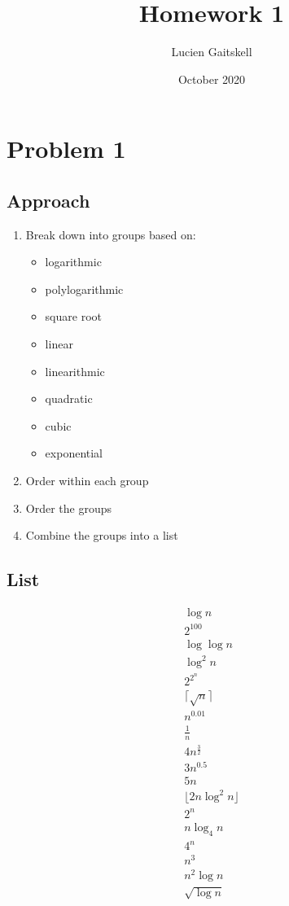 \documentclass{article}
\title{Homework 1}
\author{Lucien Gaitskell}
\date{October 2020}
\begin{document}
\maketitle

\section{Problem 1}
\subsection{Approach}

\begin{enumerate}
    \item Break down into groups based on:
    \begin{itemize}
        \item logarithmic
        \item polylogarithmic
        \item square root
        \item linear
        \item linearithmic
        \item quadratic
        \item cubic
        \item exponential
    \end{itemize}
 
    \item Order within each group
    \item Order the groups
    \item Combine the groups into a list
\end{enumerate}

\subsection{List}


\begin{align*}
    \log n \\
    2^{100} \\
    \log \log n \\
    \log^2 n \\
    2^{2^{n}} \\
    \lceil \sqrt{n} \rceil \\
    n^{0.01} \\
    \frac{1}{n} \\
    4n^{\frac{3}{2}} \\
    3n^{0.5} \\
    5n \\
    \lfloor 2n \log^2n \rfloor \\
    2^n \\
    n \log_4 n \\
    4^n \\
    n^3 \\
    n^2 \log n \\
    \sqrt{\log n}
\end{align*}

\iffalse
\begin{center}
    $\begin{array}{ c c c }
     6n\log_{3} 3 & cell2 & cell3 \\ 
     cell4 & cell5 & cell6 \\  
     cell7 & cell8 & cell9 \\
    \end{array}$
\end{center}
\fi
\end{document}
